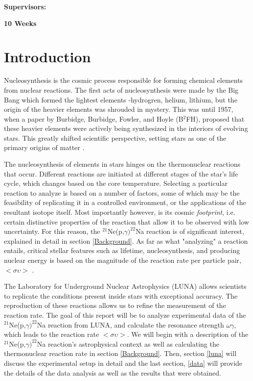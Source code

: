 \documentclass[a4paper,12pt]{article}
\begin{document}
\vfill
{\bf Supervisors:}                %

\textbf{10 Weeks}                                         %
\newpage
%
\pagestyle{plain}                               %
\setcounter{page}{1}                            %
\tableofcontents{}  
\newpage


\section{Introduction}

Nucleosynthesis is the cosmic process responsible for forming chemical elements from nuclear reactions.  The first acts of nucleosynthesis were made by the Big Bang which formed the lightest elements -hydrogren, helium, lithium, but the origin of the heavier elements was shrouded in mystery.  This was until 1957, when a paper by Burbidge, Burbidge, Fowler, and Hoyle (B$^{2}$FH), proposed that these heavier elements were actively being synthesized in the interiors of evolving stars.  This greatly shifted scientific perspective, setting stars as one of the primary origins of matter \citealp{RolfsRodney1988}.  

The nucleosynthesis of elements in stars hinges on the thermonuclear reactions that occur.  Different reactions are initiated at different stages of the star's life cycle, which changes based on the core temperature.  Selecting a particular reaction to analyze is based on a number of factors, some of which may be the feasibility of replicating it in a controlled environment, or the applications of the resultant isotope itself.  Most importantly however, is its cosmic \textit{footprint}, i.e. certain distinctive properties of the reaction that allow it to be observed with low uncertainty.  For this reason, the $^{21}$Ne(p,$\gamma)^{22}$Na reaction is of significant interest, explained in detail in section \ref{Background}.  As far as what "analyzing" a reaction entails, critical stellar features such as lifetime, nucleosynthesis, and producing nuclear energy is based on the magnitude of the reaction rate per particle pair, $<\sigma\upsilon>$ \citealp{RolfsRodney1988}.

The Laboratory for Underground Nuclear Astrophysics (LUNA) allows scientists to replicate the conditions present inside stars with exceptional accuracy.  The reproduction of these reactions allows us to refine the measurement of the reaction rate.  The goal of this report will be to analyze experimental data of the $^{21}$Ne(p,$\gamma)^{22}$Na reaction from LUNA, and calculate the resonance strength $\omega\gamma$, which leads to the reaction rate  $<\sigma\upsilon>$. We will begin with a description of the $^{21}$Ne(p,$\gamma)^{22}$Na reaction's astrophysical context as well as calculating the thermonuclear reaction rate in section \ref{Background}. Then, section \ref{luna} will discuss the experimental setup in detail and the last section, \ref{data} will provide the details of the data analysis as well as the results that were obtained.  
\end{document}
